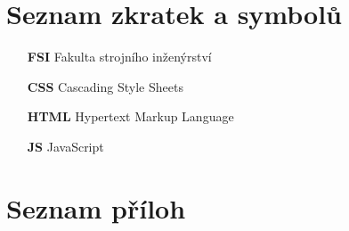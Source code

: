 \chapter*{Seznam zkratek a symbolů}
\label{chap:loa}
\begin{itemize}
    \item[\textbf{FSI}] Fakulta strojního inženýrství

    \item[\textbf{CSS}] Cascading Style Sheets
	
    \item[\textbf{HTML}] Hypertext Markup Language
	
    \item[\textbf{JS}] JavaScript
\end{itemize}

\printbibliography[heading=bibintoc,title={Seznam zdrojů}]

\listoffigures

\listoftables

\chapter*{Seznam příloh}
